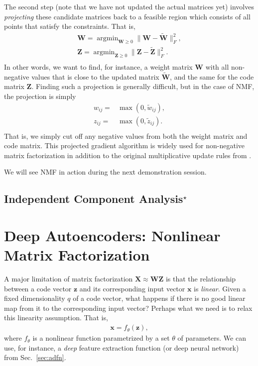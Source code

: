 \documentclass{report}
\newcommand{\vect}[1]{\mathbf{#1}}
\newcommand{\matr}[1]{\mathbf{#1}}
\newcommand{\vx}[0]{\vect{x}}
\newcommand{\vz}[0]{\vect{z}}
\newcommand{\mW}[0]{\matr{W}}
\newcommand{\mZ}[0]{\matr{Z}}
\newcommand{\mX}[0]{\matr{X}}
\DeclareMathOperator*{\argmin}{\arg \min}
\begin{document}
The second step (note that we have not updated the actual matrices yet) involves
{\it projecting} these candidate matrices back to a feasible region which
consists of all points that satisfy the constraints. That is, 
\begin{align*}
    \mW = \argmin_{\mW \geq 0} \|\mW - \tilde{\mW}\|^2_F, \\
    \mZ = \argmin_{\mZ \geq 0} \|\mZ - \tilde{\mZ}\|^2_F. \\
\end{align*}
In other words, we want to find, for instance, a weight matrix $\mW$ with all
non-negative values that is close to the updated matrix $\tilde{\mW}$, and the
same for the code matrix $\mZ$. Finding such a projection is generally
difficult, but in the case of NMF, the projection is simply
\begin{align*}
    w_{ij} =& \max(0, \tilde{w}_{ij}), \\
    z_{ij} =& \max(0, \tilde{z}_{ij}). \\
\end{align*}
That is, we simply cut off any negative values from both the weight matrix and
code matrix.  This projected gradient algorithm is widely used for non-negative
matrix factorization in addition to the original multiplicative update rules
from \cite{lee2001algorithms}.

We will see NMF in action during the next demonstration session.





\subsection{Independent Component Analysis$^\star$}


\section{Deep Autoencoders: Nonlinear Matrix Factorization}

A major limitation of matrix factorization $\mX \approx \mW\mZ$ is that the
relationship between a code vector $\vz$ and its corresponding input vector
$\vx$ is {\it linear}. Given a fixed dimensionality $q$ of a code vector, what
happens if there is no good linear map from it to the corresponding input
vector? Perhaps what we need is to relax this linearity assumption. That is,
\begin{align*}
    \vx = f_{\theta}(\vz),
\end{align*}
where $f_{\theta}$ is a nonlinear function parametrized by a set $\theta$ of
parameters. We can use, for instance, a {\it deep} feature extraction function
(or deep neural network) from Sec.~\ref{sec:adfn}.
\end{document}
